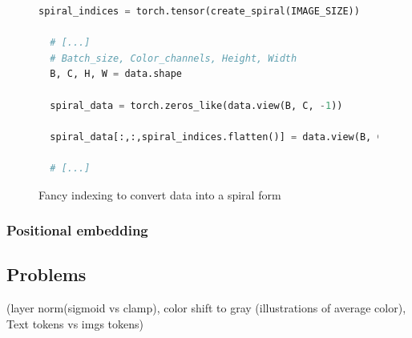 \begin{figure}[H]
\centering
\begin{lstlisting}[language=Python]
  spiral_indices = torch.tensor(create_spiral(IMAGE_SIZE))

  # [...]
  # Batch_size, Color_channels, Height, Width
  B, C, H, W = data.shape

  spiral_data = torch.zeros_like(data.view(B, C, -1))

  spiral_data[:,:,spiral_indices.flatten()] = data.view(B, C, -1)

  # [...]
\end{lstlisting}
\caption{Fancy indexing to convert data into a spiral form}
\label{fig:spiral_indexing_code}
\end{figure}

    \subsubsection{Positional embedding}

\subsection{Problems}
    (layer norm(sigmoid vs clamp), color shift to gray (illustrations of average color), Text tokens vs imgs tokens)